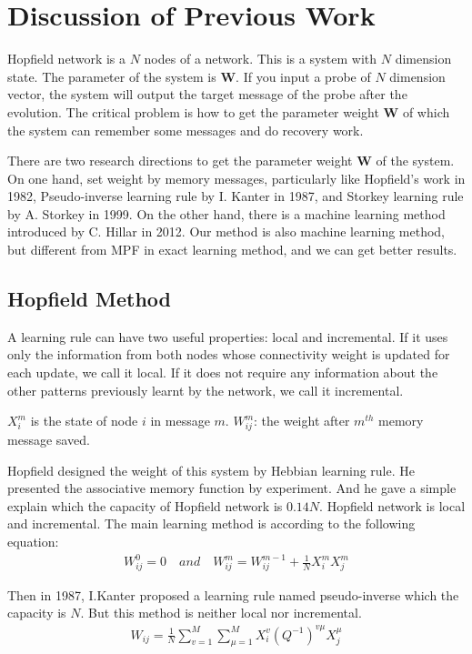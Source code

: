 
\section{Discussion of Previous Work}

Hopfield network is a $N$ nodes of a network. 
This is a system with $N$ dimension state. The parameter of the system is $\textbf{W}$. 
If you input a probe of $N$ dimension vector, the system will output the target message of the probe after the evolution. 
The critical problem is how to get the parameter weight $\textbf{W}$ of which the system can remember some messages and do recovery work.

There are two research directions to get the parameter weight $\textbf{W}$ of the system. 
On one hand, set weight by memory messages, particularly like Hopfield's work in 1982\cite{hopfield1982neural}, Pseudo-inverse learning rule by I. Kanter in 1987\cite{kanter1987associative}, and Storkey learning rule by A. Storkey in 1999\cite{storkey1999basins}. 
On the other hand, there is a machine learning method introduced by C. Hillar in 2012\cite{hillar2012efficient}. 
Our method is also machine learning method, but different from MPF in exact learning method, and we can get better results.

\subsection{Hopfield Method}
A learning rule can have two useful properties: local and incremental. 
If it uses only the information from both nodes whose connectivity weight is updated for each update, we call it local. 
If it does not require any information about the other patterns previously learnt by the network, we call it incremental.

$X_i^m$ is the state of node $i$ in message $m$. $W_{ij}^m$: the weight after $m^{th}$ memory message saved.

Hopfield designed the weight of this system by Hebbian learning rule. 
He presented the associative memory function by experiment. 
And he gave a simple explain which the capacity of Hopfield network is $0.14N$. 
Hopfield network is local and incremental.
The main learning method is according to the following equation:
    \begin{eqnarray*}
     W_{ij}^0 = 0 \quad and \quad W_{ij}^m = W_{ij}^{m - 1} + \frac{1}{N} X_i^mX_j^m
    \end{eqnarray*}

Then in 1987, I.Kanter proposed a learning rule named pseudo-inverse which the capacity is $N$. But this method is neither local nor incremental.
    \begin{eqnarray*}
     W_{ij} = \frac{1}{N} \sum_{v=1}^M \sum_{\mu = 1}^M X_i^v(Q^{-1})^{v\mu}X_j^{\mu}
    \end{eqnarray*}

